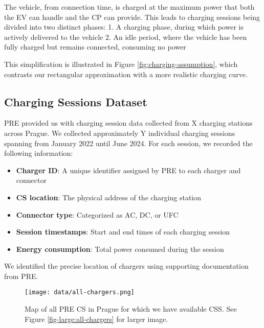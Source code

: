 The vehicle, from connection time, is charged at the maximum power that both the \acrlong{EV} can handle and the \acrlong{CP} can provide. This leads to charging sessions being divided into two distinct phases:
1. A charging phase, during which power is actively delivered to the vehicle
2. An idle period, where the vehicle has been fully charged but remains connected, consuming no power

This simplification is illustrated in Figure \ref{fig:charging-assumption}, which contrasts our rectangular approximation with a more realistic charging curve.

\subsection{Charging Sessions Dataset}

PRE provided us with charging session data collected from X charging stations across Prague. We collected approximately Y individual charging sessions spanning from January 2022 until June 2024. For each session, we recorded the following information:


\begin{itemize}
    \item \textbf{Charger ID}: A unique identifier assigned by PRE to each charger and connector
    \item \textbf{\acrlong{CS} location}: The physical address of the charging station
    \item \textbf{Connector type}: Categorized as AC, DC, or UFC
    \item \textbf{Session timestamps}: Start and end times of each charging session
    \item \textbf{Energy consumption}: Total power consumed during the session
\end{itemize}


We identified the precise location of chargers using supporting documentation from PRE.

\begin{figure}[]
    \texttt{[image: data/all-chargers.png]}
    \caption{Map of all PRE \acrlong{CS} in Prague for which we have available \acrlong{CSS}. See Figure \ref{fig-large:all-chargers} for larger image.}
\end{figure}

